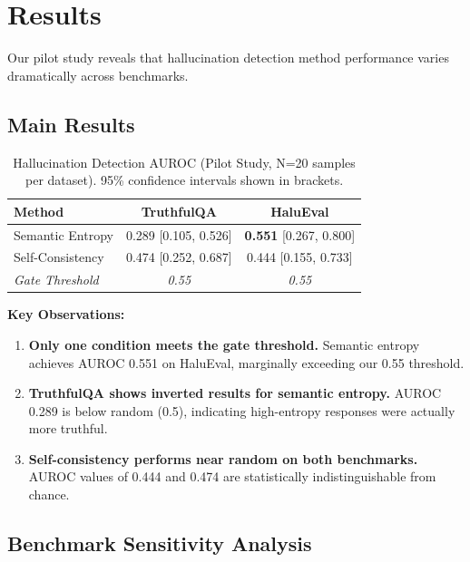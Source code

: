 \section{Results}
\label{sec:results}

Our pilot study reveals that hallucination detection method performance varies dramatically across benchmarks.

\subsection{Main Results}

\begin{table}[h]
\centering
\begin{tabular}{@{}lcc@{}}
\toprule
Method & TruthfulQA & HaluEval \\
\midrule
Semantic Entropy & 0.289 [0.105, 0.526] & \textbf{0.551} [0.267, 0.800] \\
Self-Consistency & 0.474 [0.252, 0.687] & 0.444 [0.155, 0.733] \\
\midrule
\textit{Gate Threshold} & \textit{0.55} & \textit{0.55} \\
\bottomrule
\end{tabular}
\caption{Hallucination Detection AUROC (Pilot Study, N=20 samples per dataset). 95\% confidence intervals shown in brackets.}
\label{tab:main_results}
\end{table}

\textbf{Key Observations:}

\begin{enumerate}
    \item \textbf{Only one condition meets the gate threshold.} Semantic entropy achieves AUROC 0.551 on HaluEval, marginally exceeding our 0.55 threshold.

    \item \textbf{TruthfulQA shows inverted results for semantic entropy.} AUROC 0.289 is below random (0.5), indicating high-entropy responses were actually more truthful.

    \item \textbf{Self-consistency performs near random on both benchmarks.} AUROC values of 0.444 and 0.474 are statistically indistinguishable from chance.
\end{enumerate}

\subsection{Benchmark Sensitivity Analysis}

